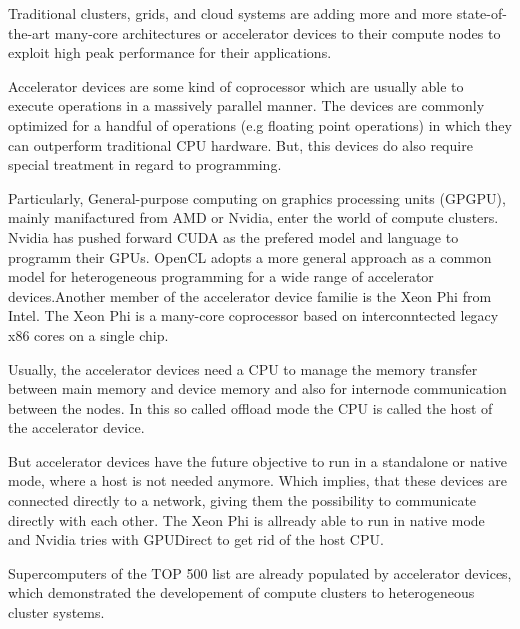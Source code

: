 Traditional clusters, grids, and cloud systems are adding more and
more state-of-the-art many-core architectures or accelerator devices
to their compute nodes to exploit high peak performance for their applications.

Accelerator devices are some kind of coprocessor which are usually
able to execute operations in a massively parallel manner.  The
devices are commonly optimized for a handful of operations (e.g
floating point operations) in which they can outperform traditional
CPU hardware. But, this devices do also require special treatment in
regard to programming.

Particularly, General-purpose computing on graphics processing units
(GPGPU), mainly manifactured from AMD or Nvidia, enter the world of
compute clusters. Nvidia has pushed forward CUDA\cite{ref:cuda} as the
prefered model and language to programm their
GPUs. OpenCL\cite{ref:opencl} adopts a more general approach as a
common model for heterogeneous programming for a wide range of
accelerator devices.Another member of the accelerator device familie
is the Xeon Phi\cite{ref:xeon_phi} from Intel. The Xeon Phi is a
many-core coprocessor based on interconntected legacy x86 cores on a
single chip.

Usually, the accelerator devices need a CPU to manage the memory
transfer between main memory and device memory and also for internode
communication between the nodes. In this so called offload mode the
CPU is called the host of the accelerator device.

But accelerator devices have the future objective to run in a
standalone or native mode, where a host is not needed anymore.  Which
implies, that these devices are connected directly to a network,
giving them the possibility to communicate directly with each
other. The Xeon Phi is allready able to run in native mode and
Nvidia tries with GPUDirect to get rid of the host CPU.

Supercomputers of the TOP 500 list \cite{ref:top500} are already populated
by accelerator devices, which demonstrated the developement of compute
clusters to heterogeneous cluster systems.


